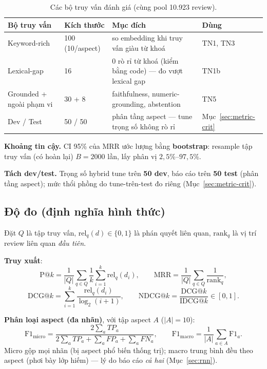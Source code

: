 \documentclass[12pt,a4paper]{article}
\begin{document}
\begin{table}[H]
\centering\small
\caption{Các bộ truy vấn đánh giá (cùng pool 10.923 review).}
\renewcommand{\arraystretch}{1.15}
\begin{tabular}{p{3.1cm}p{1.7cm}p{6.0cm}l}
\toprule
\textbf{Bộ truy vấn} & \textbf{Kích thước} & \textbf{Mục đích} & \textbf{Dùng} \\
\midrule
Keyword-rich & 100 (10/aspect) & so embedding khi truy vấn giàu từ khoá & TN1, TN3 \\
Lexical-gap & 16 & 0 rò rỉ từ khoá (kiểm bằng code) --- đo vượt lexical gap & TN1b \\
Grounded + ngoài phạm vi & 30 + 8 & faithfulness, numeric-grounding, abstention & TN5 \\
Dev / Test & 50 / 50 & phân tầng aspect --- tune trọng số không rò rỉ & Mục~\ref{sec:metric-crit} \\
\bottomrule
\end{tabular}
\end{table}

\noindent\textbf{Khoảng tin cậy.} CI 95\% của MRR ước lượng bằng \textbf{bootstrap}: resample tập truy vấn (có hoàn lại) $B=2000$ lần, lấy phân vị $2{,}5\%$--$97{,}5\%$.

\noindent\textbf{Tách dev/test.} Trọng số hybrid tune trên \textbf{50 dev}, báo cáo trên \textbf{50 test} (phân tầng aspect); mức thổi phồng do tune-trên-test đo riêng (Mục~\ref{sec:metric-crit}).

\subsection{Độ đo (định nghĩa hình thức)}
\label{sec:metrics}

Đặt $Q$ là tập truy vấn, $\mathrm{rel}_q(d)\in\{0,1\}$ là phán quyết liên quan, $\mathrm{rank}_q$ là vị trí review liên quan \textit{đầu tiên}.

\noindent\textbf{Truy xuất}:
\[
  \text{P@}k=\frac{1}{|Q|}\sum_{q\in Q}\frac{1}{k}\sum_{i=1}^{k}\mathrm{rel}_q(d_i),
  \qquad
  \text{MRR}=\frac{1}{|Q|}\sum_{q\in Q}\frac{1}{\mathrm{rank}_q},
\]
\[
  \text{DCG@}k=\sum_{i=1}^{k}\frac{\mathrm{rel}_q(d_i)}{\log_2(i+1)},
  \qquad
  \text{NDCG@}k=\frac{\text{DCG@}k}{\text{IDCG@}k}\in[0,1].
\]

\noindent\textbf{Phân loại aspect (đa nhãn)}, với tập aspect $A$ ($|A|=10$):
\[
  \text{F1}_{\text{micro}}=\frac{2\sum_{a}TP_a}{2\sum_a TP_a+\sum_a FP_a+\sum_a FN_a},
  \qquad
  \text{F1}_{\text{macro}}=\frac{1}{|A|}\sum_{a\in A}\text{F1}_a.
\]
Micro gộp mọi nhãn (bị aspect phổ biến thống trị); macro trung bình đều theo aspect (phơi bày lớp hiếm) --- lý do báo cáo \textit{cả hai} (Mục~\ref{sec:rnn}).
\end{document}
